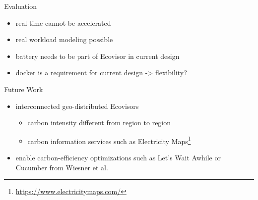 \begin{frame}{Evaluation}
    \begin{itemize}
        \item real-time cannot be accelerated
        \item real workload modeling possible
        \item battery needs to be part of Ecovisor in current design
        \item docker is a requirement for current design -> flexibility?
    \end{itemize}
\end{frame}

\begin{frame}{Future Work}
    \begin{itemize}
        \item interconnected geo-distributed Ecovisors
            \begin{itemize}
                \item carbon intensity different from region to region
                \item carbon information services such as Electricity
                    Maps\footnote{\url{https://www.electricitymaps.com/}\vspace{1cm}}
            \end{itemize}
    \end{itemize}
    \begin{itemize}
        \item[\arrow] enable carbon-efficiency optimizations such as
            Let's Wait Awhile or Cucumber from Wiesner et al. \cite{wiesner2021,
            wiesner2022}
    \end{itemize}
\end{frame}
